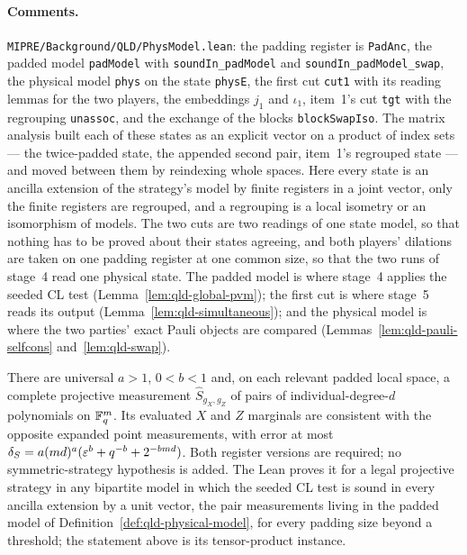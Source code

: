 \paragraph{Comments.} \texttt{MIPRE/Background/QLD/PhysModel.lean}: the padding register is
\texttt{PadAnc}, the padded model \texttt{padModel} with \texttt{soundIn\_padModel} and
\texttt{soundIn\_padModel\_swap}, the physical model \texttt{phys} on the state \texttt{physE}, the
first cut \texttt{cut1} with its reading lemmas for the two players, the
embeddings $j_1$ and $\iota_1$, item~1's cut \texttt{tgt} with the regrouping \texttt{unassoc}, and
the exchange of the blocks \texttt{blockSwapIso}. The matrix analysis built each of these states as
an explicit vector on a product of index sets --- the twice-padded state, the appended second pair,
item~1's regrouped state --- and moved between them by reindexing whole spaces. Here every state is
an ancilla extension of the strategy's model by finite registers in a joint vector, only the finite
registers are regrouped, and a regrouping is a local isometry or an isomorphism of models. The two
cuts are two readings of one state model, so that nothing has to be proved about their states
agreeing, and both players' dilations are taken on one padding register at one common size, so
that the two runs of stage~4 read one physical state. The padded model is where stage~4 applies the
seeded CL test (Lemma~\ref{lem:qld-global-pvm}); the first cut is where stage~5 reads its output
(Lemma~\ref{lem:qld-simultaneous}); and the physical model is where the two parties' exact Pauli
objects are compared (Lemmas~\ref{lem:qld-pauli-selfcons} and~\ref{lem:qld-swap}).

\effortHard

\begin{lemma}
\label{lem:qld-simultaneous}
\leanok
There are universal $a>1$, $0<b<1$ and, on each relevant padded local space,
a complete projective measurement $\widehat S_{g_X,g_Z}$ of pairs of
individual-degree-$d$ polynomials on $\mathbb{F}_q^m$. Its evaluated $X$ and $Z$
marginals are consistent with the opposite expanded point measurements,
with error at most
$\delta_S=a(md)^a(\varepsilon^b+q^{-b}+2^{-bmd})$.
Both register versions are required; no symmetric-strategy hypothesis is added.
The Lean proves it for a legal projective strategy in any bipartite model in which the seeded CL
test is sound in every ancilla extension by a unit vector, the pair measurements living in the
padded model of Definition~\ref{def:qld-physical-model}, for every padding size beyond a threshold;
the statement above is its tensor-product instance.
\end{lemma}

